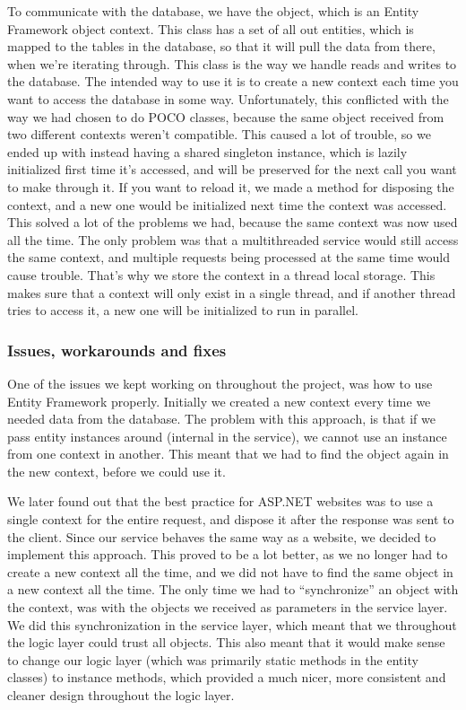 To communicate with the database, we have the  object, which is an Entity Framework object context. This class has a set of all out entities, which is mapped to the tables in the database, so that it will pull the data from there, when we're iterating through. This class is the way we handle reads and writes to the database. The intended way to use it is to create a new context each time you want to access the database in some way. Unfortunately, this conflicted with the way we had chosen to do POCO classes, because the same object received from two different contexts weren't compatible. This caused a lot of trouble, so we ended up with instead having a shared singleton instance, which is lazily initialized first time it's accessed, and will be preserved for the next call you want to make through it. If you want to reload it, we made a method for disposing the context, and a new one would be initialized next time the context was accessed. This solved a lot of the problems we had, because the same context was now used all the time. The only problem was that a multithreaded service would still access the same context, and multiple requests being processed at the same time would cause trouble. That's why we store the context in a thread local storage. This makes sure that a context will only exist in a single thread, and if another thread tries to access it, a new one will be initialized to run in parallel.

\subsubsection{Issues, workarounds and fixes}
\label{Implementation_Service_Architecture_Issues}

One of the issues we kept working on throughout the project, was how to use Entity Framework properly. Initially we created a new context every time we needed data from the database. The problem with this approach, is that if we pass entity instances around (internal in the service), we cannot use an instance from one context in another. This meant that we had to find the object again in the new context, before we could use it.

We later found out that the best practice for ASP.NET websites was to use a single context for the entire request, and dispose it after the response was sent to the client. Since our service behaves the same way as a website, we decided to implement this approach. This proved to be a lot better, as we no longer had to create a new context all the time, and we did not have to find the same object in a new context all the time. The only time we had to ``synchronize'' an object with the context, was with the objects we received as parameters in the service layer. We did this synchronization in the service layer, which meant that we throughout the logic layer could trust all objects. This also meant that it would make sense to change our logic layer (which was primarily static methods in the entity classes) to instance methods, which provided a much nicer, more consistent and cleaner design throughout the logic layer.

